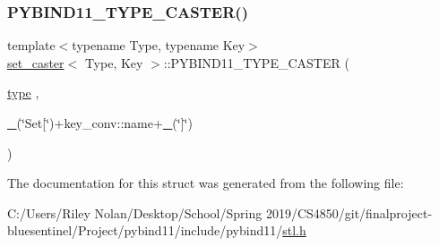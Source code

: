 \subsubsection{\texorpdfstring{PYBIND11\_TYPE\_CASTER()}{PYBIND11\_TYPE\_CASTER()}}
{\footnotesize\ttfamily template$<$typename Type, typename Key$>$ \\
\mbox{\hyperlink{structset__caster}{set\+\_\+caster}}$<$ Type, Key $>$\+::P\+Y\+B\+I\+N\+D11\+\_\+\+T\+Y\+P\+E\+\_\+\+C\+A\+S\+T\+ER (\begin{DoxyParamCaption}\item[{\mbox{\hyperlink{structset__caster_af955f5e8e104168a805e74992fc5fc63}{type}}}]{,  }\item[{\mbox{\hyperlink{descr_8h_af114703e20c6527e87163eb2798f74b8}{\+\_\+}}(\char`\"{}Set\mbox{[}\char`\"{})+key\+\_\+conv\+::name+\mbox{\hyperlink{descr_8h_af114703e20c6527e87163eb2798f74b8}{\+\_\+}}(\char`\"{}\mbox{]}\char`\"{})}]{ }\end{DoxyParamCaption})}



The documentation for this struct was generated from the following file\+:\begin{DoxyCompactItemize}
\item 
C\+:/\+Users/\+Riley Nolan/\+Desktop/\+School/\+Spring 2019/\+C\+S4850/git/finalproject-\/bluesentinel/\+Project/pybind11/include/pybind11/\mbox{\hyperlink{stl_8h}{stl.\+h}}\end{DoxyCompactItemize}
